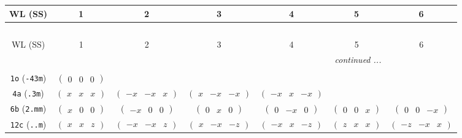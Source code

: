 \documentclass[fleqn,9pt,landscape]{jsarticle}
\begin{document}
\begin{center}
\renewcommand{\arraystretch}{1.2}
\begin{longtable}{ccccccc}
 \hline \hline
WL (SS) & 1 & 2 & 3 & 4 & 5 & 6 \\ \hline \endfirsthead

\multicolumn{6}{l}{\tablename\ \thetable{}} \\
 \hline \hline
WL (SS) & 1 & 2 & 3 & 4 & 5 & 6 \\ \hline \endhead

 \hline \hline
\multicolumn{6}{r}{\footnotesize\it continued ...} \\ \endfoot

 \hline \hline
\multicolumn{6}{r}{} \\ \endlastfoot

{\tt 1o} ({\tt -43m}) & $ \begin{pmatrix} 0 & 0 & 0 \end{pmatrix} $ & $  $ & $  $ & $  $ & $  $ & $  $ \\ \hline
{\tt 4a} ({\tt .3m}) & $ \begin{pmatrix} x & x & x \end{pmatrix} $ & $ \begin{pmatrix} - x & - x & x \end{pmatrix} $ & $ \begin{pmatrix} x & - x & - x \end{pmatrix} $ & $ \begin{pmatrix} - x & x & - x \end{pmatrix} $ & $  $ & $  $ \\ \hline
{\tt 6b} ({\tt 2.mm}) & $ \begin{pmatrix} x & 0 & 0 \end{pmatrix} $ & $ \begin{pmatrix} - x & 0 & 0 \end{pmatrix} $ & $ \begin{pmatrix} 0 & x & 0 \end{pmatrix} $ & $ \begin{pmatrix} 0 & - x & 0 \end{pmatrix} $ & $ \begin{pmatrix} 0 & 0 & x \end{pmatrix} $ & $ \begin{pmatrix} 0 & 0 & - x \end{pmatrix} $ \\ \hline
{\tt 12c} ({\tt ..m}) & $ \begin{pmatrix} x & x & z \end{pmatrix} $ & $ \begin{pmatrix} - x & - x & z \end{pmatrix} $ & $ \begin{pmatrix} x & - x & - z \end{pmatrix} $ & $ \begin{pmatrix} - x & x & - z \end{pmatrix} $ & $ \begin{pmatrix} z & x & x \end{pmatrix} $ & $ \begin{pmatrix} - z & - x & x \end{pmatrix} $ \\

\end{longtable}
\end{center}
\end{document}
